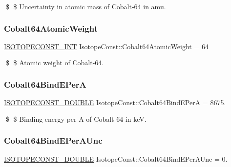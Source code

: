 \$ \$ Uncertainty in atomic mass of Cobalt-\/64 in amu. \mbox{\label{group___isotope_const-_cobalt-_co64_ga06a5a5f17d0238cecf81433a6c55a2a4}} 
\subsubsection{\texorpdfstring{Cobalt64\+Atomic\+Weight}{Cobalt64AtomicWeight}}
{\footnotesize\ttfamily \mbox{\hyperlink{group___isotope_const-_macros_ga5f18360b3e99483a35c32d789e62621c}{I\+S\+O\+T\+O\+P\+E\+C\+O\+N\+S\+T\+\_\+\+I\+NT}} Isotope\+Const\+::\+Cobalt64\+Atomic\+Weight = 64}

\$ \$ Atomic weight of Cobalt-\/64. \mbox{\label{group___isotope_const-_cobalt-_co64_ga875a59a5f59ca3915f4b0cf4f674783b}} 
\subsubsection{\texorpdfstring{Cobalt64\+Bind\+E\+PerA}{Cobalt64BindEPerA}}
{\footnotesize\ttfamily \mbox{\hyperlink{group___isotope_const-_macros_ga8f45a7272ce02c0b4c65c44636ed719a}{I\+S\+O\+T\+O\+P\+E\+C\+O\+N\+S\+T\+\_\+\+D\+O\+U\+B\+LE}} Isotope\+Const\+::\+Cobalt64\+Bind\+E\+PerA = 8675.}

\$ \$ Binding energy per A of Cobalt-\/64 in keV. \mbox{\label{group___isotope_const-_cobalt-_co64_ga56d90af75ef423ef58a314025249a249}} 
\subsubsection{\texorpdfstring{Cobalt64\+Bind\+E\+Per\+A\+Unc}{Cobalt64BindEPerAUnc}}
{\footnotesize\ttfamily \mbox{\hyperlink{group___isotope_const-_macros_ga8f45a7272ce02c0b4c65c44636ed719a}{I\+S\+O\+T\+O\+P\+E\+C\+O\+N\+S\+T\+\_\+\+D\+O\+U\+B\+LE}} Isotope\+Const\+::\+Cobalt64\+Bind\+E\+Per\+A\+Unc = 0.}

